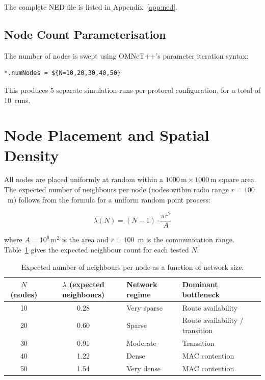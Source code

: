 The complete NED file is listed in Appendix~\ref{app:ned}.

\subsection{Node Count Parameterisation}

The number of nodes is swept using OMNeT++'s parameter iteration syntax:

\begin{lstlisting}[caption={Node count sweep in \texttt{omnetpp.ini}.}]
*.numNodes = ${N=10,20,30,40,50}
\end{lstlisting}

This produces 5 separate simulation runs per protocol configuration, for a total of
10~runs.

\section{Node Placement and Spatial Density}

All nodes are placed uniformly at random within a $1000\,\text{m} \times 1000\,\text{m}$
square area. The expected number of neighbours per node (nodes within radio range
$r = 100$~m) follows from the formula for a uniform random point process:

\begin{equation}
  \lambda(N) = (N-1) \cdot \frac{\pi r^2}{A}
  \label{eq:neighbours}
\end{equation}

where $A = 10^6\,\text{m}^2$ is the area and $r = 100$~m is the communication range.
Table~\ref{tab:neighbours} gives the expected neighbour count for each tested $N$.

\begin{table}[ht]
\centering
\caption{Expected number of neighbours per node as a function of network size.}
\label{tab:neighbours}
\begin{tabular}{@{}ccll@{}}
\toprule
$N$ (nodes) & $\lambda$ (expected neighbours) & Network regime & Dominant bottleneck \\
\midrule
10 & 0.28 & Very sparse  & Route availability \\
20 & 0.60 & Sparse       & Route availability / transition \\
30 & 0.91 & Moderate     & Transition \\
40 & 1.22 & Dense        & MAC contention \\
50 & 1.54 & Very dense   & MAC contention \\
\bottomrule
\end{tabular}
\end{table}

